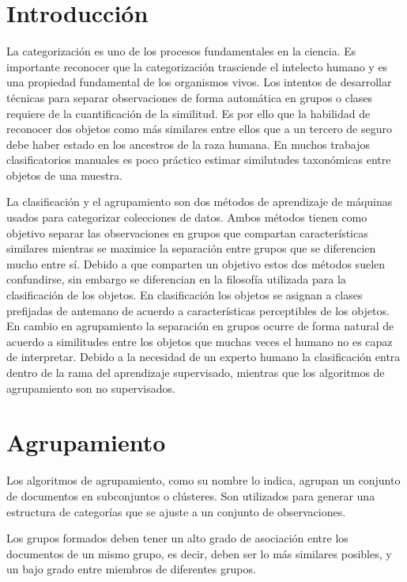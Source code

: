 \documentclass{llncs}
\begin{document}
\newpage
{}

\section{Introducci\'on}

La categorizaci\'on es uno de los procesos fundamentales en la ciencia. Es importante reconocer que la categorizaci\'on trasciende el intelecto humano y es una propiedad fundamental de los organismos vivos. Los intentos de desarrollar t\'ecnicas para separar observaciones de forma autom\'atica en grupos o clases requiere de la cuantificaci\'on de la similitud. Es por ello que la habilidad de reconocer dos objetos como m\'as similares entre ellos que a un tercero de seguro debe haber estado en los ancestros de la raza humana. En muchos trabajos clasificatorios manuales es poco pr\'actico estimar similutudes taxon\'omicas entre objetos de una muestra.

La clasificaci\'on y el agrupamiento son dos m\'etodos de aprendizaje de m\'aquinas usados para categorizar colecciones de datos. Ambos m\'etodos tienen como objetivo separar las observaciones en grupos que compartan caracter\'isticas similares mientras se maximice la separaci\'on entre grupos que se diferencien mucho entre s\'i. Debido a que comparten un objetivo estos dos m\'etodos suelen confundirse, sin embargo se diferencian en la filosof\'ia utilizada para la clasificaci\'on de los objetos. En clasificaci\'on los objetos se asignan a clases prefijadas de antemano de acuerdo a caracter\'isticas perceptibles de los objetos. En cambio en agrupamiento la separaci\'on en grupos ocurre de forma natural de acuerdo a similitudes entre los objetos que muchas veces el humano no es capaz de interpretar. Debido a la necesidad de un experto humano la clasificaci\'on entra dentro de la rama del aprendizaje supervisado, mientras que los algoritmos de agrupamiento son no supervisados.

\section{Agrupamiento}

Los algoritmos de agrupamiento, como su nombre lo indica, agrupan un conjunto de documentos en subconjuntos o clústeres. Son utilizados para generar una estructura de categorías que se ajuste a un conjunto de observaciones. 

Los grupos formados deben tener un alto grado de asociación entre los documentos de un mismo grupo, es decir, deben ser lo m\'as similares posibles, y un bajo grado entre miembros de diferentes grupos. 
\end{document}
